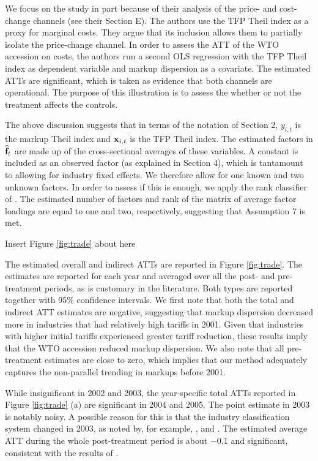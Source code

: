 \documentclass[12pt,fleqn]{article}
\begin{document}
  We focus on the \citet{lu2015trade} study in part because of their analysis of the price- and cost-change channels (see their Section E). The authors use the TFP Theil index as a proxy for marginal costs. They argue that its inclusion allows them to partially isolate the price-change channel. In order to assess the ATT of the WTO accession on costs, the authors run a second OLS regression with the TFP Theil index as dependent variable and markup dispersion as a covariate. The estimated ATTs are significant, which is taken as evidence that both channels are operational. The purpose of this illustration is to assess the whether or not the treatment affects the controls.
  
  The above discussion suggests that in terms of the notation of Section 2, $y_{i,t}$ is the markup Theil index and $\mathbf{x}_{i,t}$ is the TFP Theil index. The estimated factors in $\widehat{\mathbf{f}}_t$ are made up of the cross-sectional averages of these variables. A constant is included as an observed factor (as explained in Section 4), which is tantamount to allowing for industry fixed effects. We therefore allow for one known and two unknown factors. In order to assess if this is enough, we apply the rank classifier of \citet{De_Vos_2024test}. The estimated number of factors and rank of the matrix of average factor loadings are equal to one and two, respectively, suggesting that Assumption 7 is met.
  
  \begin{center}
  {\sc Insert Figure \ref{fig:trade} about here}
  \end{center}
  
  The estimated overall and indirect ATTs are reported in Figure \ref{fig:trade}. The estimates are reported for each year and averaged over all the post- and pre-treatment periods, as is customary in the literature. Both types are reported together with 95\% confidence intervals. We first note that both the total and indirect ATT estimates are negative, suggesting that markup dispersion decreased more in industries that had relatively high tariffs in 2001. Given that industries with higher initial tariffs experienced greater tariff reduction, these results imply that the WTO accession reduced markup dispersion. We also note that all pre-treatment estimates are close to zero, which implies that our method adequately captures the non-parallel trending in markups before 2001.
  
  While insignificant in 2002 and 2003, the year-specific total ATTs reported in Figure \ref{fig:trade} (a) are significant in 2004 and 2005. The point estimate in 2003 is notably noisy. A possible reason for this is that the industry classification system changed in 2003, as noted by, for example, \citet{Chen_etal_2019}, and \citet{lu2015trade}. The estimated average ATT during the whole post-treatment period is about $-0.1$ and significant, consistent with the results of \citet{Chen_etal_2019}.
  
\end{document}
